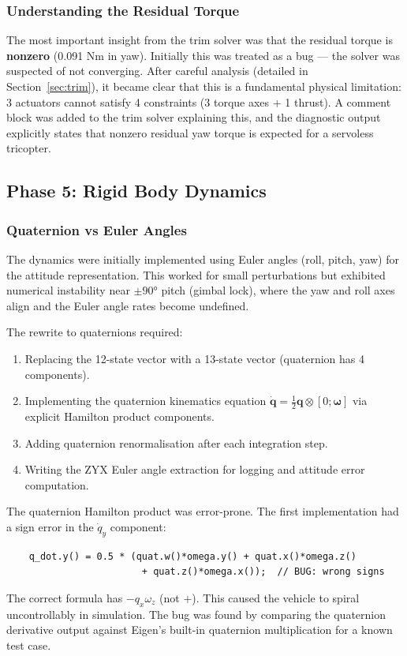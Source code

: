 \documentclass[12pt, a4paper]{article}
\newcommand{\bq}{\bm{q}}
\newcommand{\bomega}{\bm{\omega}}
\begin{document}
\subsubsection{Understanding the Residual Torque}

The most important insight from the trim solver was that the residual torque is \textbf{nonzero} (0.091 Nm in yaw).  Initially this was treated as a bug --- the solver was suspected of not converging.  After careful analysis (detailed in Section~\ref{sec:trim}), it became clear that this is a fundamental physical limitation: 3 actuators cannot satisfy 4 constraints (3 torque axes + 1 thrust).  A comment block was added to the trim solver explaining this, and the diagnostic output explicitly states that nonzero residual yaw torque is expected for a servoless tricopter.

\subsection{Phase 5: Rigid Body Dynamics}

\subsubsection{Quaternion vs Euler Angles}

The dynamics were initially implemented using Euler angles (roll, pitch, yaw) for the attitude representation.  This worked for small perturbations but exhibited numerical instability near $\pm 90°$ pitch (gimbal lock), where the yaw and roll axes align and the Euler angle rates become undefined.

The rewrite to quaternions required:
\begin{enumerate}
    \item Replacing the 12-state vector with a 13-state vector (quaternion has 4 components).
    \item Implementing the quaternion kinematics equation $\dot{\bq} = \frac{1}{2} \bq \otimes [0; \bomega]$ via explicit Hamilton product components.
    \item Adding quaternion renormalisation after each integration step.
    \item Writing the ZYX Euler angle extraction for logging and attitude error computation.
\end{enumerate}

The quaternion Hamilton product was error-prone.  The first implementation had a sign error in the $\dot{q}_y$ component:
\begin{verbatim}
    q_dot.y() = 0.5 * (quat.w()*omega.y() + quat.x()*omega.z()
                        + quat.z()*omega.x());  // BUG: wrong signs
\end{verbatim}
The correct formula has $-q_x \omega_z$ (not $+$).  This caused the vehicle to spiral uncontrollably in simulation.  The bug was found by comparing the quaternion derivative output against Eigen's built-in quaternion multiplication for a known test case.
\end{document}
